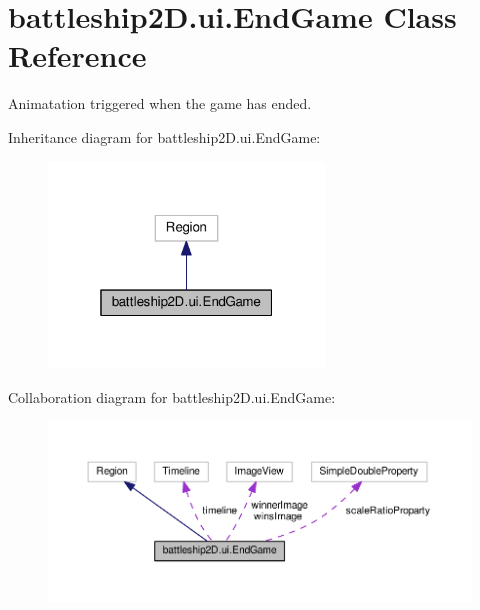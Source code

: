 \hypertarget{classbattleship2D_1_1ui_1_1EndGame}{\section{battleship2\-D.\-ui.\-End\-Game Class Reference}
\label{classbattleship2D_1_1ui_1_1EndGame}
}


Animatation triggered when the game has ended.  




Inheritance diagram for battleship2\-D.\-ui.\-End\-Game\-:\nopagebreak
\begin{figure}[H]
\begin{center}
\leavevmode
\includegraphics[width=208pt]{classbattleship2D_1_1ui_1_1EndGame__inherit__graph}
\end{center}
\end{figure}


Collaboration diagram for battleship2\-D.\-ui.\-End\-Game\-:\nopagebreak
\begin{figure}[H]
\begin{center}
\leavevmode
\includegraphics[width=350pt]{classbattleship2D_1_1ui_1_1EndGame__coll__graph}
\end{center}
\end{figure}
